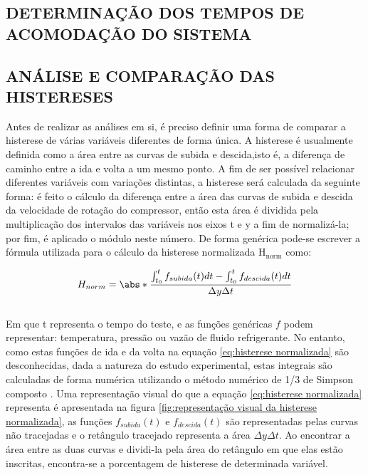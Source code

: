 \subsection{\MakeUppercase{Determinação dos Tempos de Acomodação do Sistema}}

\subsection{\MakeUppercase{Análise e Comparação das Histereses}} \label{subsec:Método de Análise da Histerese}

Antes de realizar as análises em si, é preciso definir uma forma de comparar a histerese de várias variáveis diferentes de forma única. A histerese é usualmente definida como a área entre as curvas de subida e descida,isto é, a diferença de caminho entre a ida e volta a um mesmo ponto. A fim de ser possível relacionar diferentes variáveis com variações distintas, a histerese será calculada da seguinte forma: é feito o cálculo da diferença entre a área das curvas de subida e descida da velocidade de rotação do compressor, então esta área é dividida pela multiplicação dos intervalos das variáveis nos eixos t e y a fim de normalizá-la; por fim, é aplicado o módulo neste número. De forma genérica pode-se escrever a fórmula utilizada para o cálculo da histerese normalizada $\text{H}_\text{norm}$ como:

\begin{equation}
    H_{norm} = \abs*{{\frac{\int_{t_0} ^t  f_{subida}(t) dt - \int_{t_0} ^t  f_{descida}(t) dt   }{\Delta y\Delta t }}}
    \label{eq:histerese normalizada}
\end{equation}
\\
Em que t representa o tempo do teste, e as funções genéricas $f$ podem representar: temperatura, pressão ou vazão de fluido refrigerante. No entanto, como estas funções de ida e da volta na equação \ref{eq:histerese normalizada} são desconhecidas, dada a natureza do estudo experimental, estas integrais são calculadas de forma numérica utilizando o método numérico de 1/3 de Simpson composto \cite{ChapraNumerico}. Uma representação visual do que a equação \ref{eq:histerese normalizada} representa é apresentada na figura \ref{fig:representação visual da histerese normalizada}, as funções $f_{subida}(t)$ e $f_{descida}(t)$ são representadas pelas curvas não tracejadas e o retângulo tracejado representa a área $\Delta y \Delta t$. Ao encontrar a área entre as duas curvas e dividi-la pela área do retângulo em que elas estão inscritas, encontra-se a porcentagem de histerese de determinada variável.

